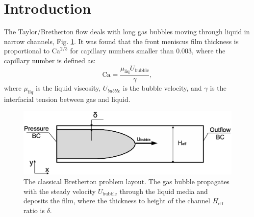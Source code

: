 \documentclass[preprint,12pt]{elsarticle}
\newcommand{\Ca}{\mathrm{Ca}}
\begin{document}
\linenumbers





\section{Introduction}
The Taylor/Bretherton \cite{bretherton} flow deals with long gas bubbles moving through liquid in
narrow channels, Fig. \ref{fig:classical:bretherton}. It was found that the front meniscus film
thickness is proportional
to $\Ca^{2/3}$ for capillary numbers smaller than $0.003$, where the capillary number is defined as:
\begin{equation}
\label{capillary:number:definition}
\Ca=\frac{\mu_\mathrm{liq} U_\mathrm{bubble}}{\gamma},
\end{equation}
where $\mu_{liq}$ is the liquid viscosity, $U_{bubble}$ is the bubble velocity, and
$\gamma$ is the interfacial tension between gas and liquid.
\begin{figure}
\includegraphics[width=\textwidth]{Figures/benchmark_bretherton.eps}
\caption{The classical Bretherton problem layout. The gas bubble
propagates with the steady velocity $U_{\mathrm{bubble}}$ through the liquid media and deposits
the film, where the thickness to height of the channel $H_{\mathrm{eff}}$ ratio is 
$\delta$.\label{fig:classical:bretherton}} 
\end{figure}
\end{document}
